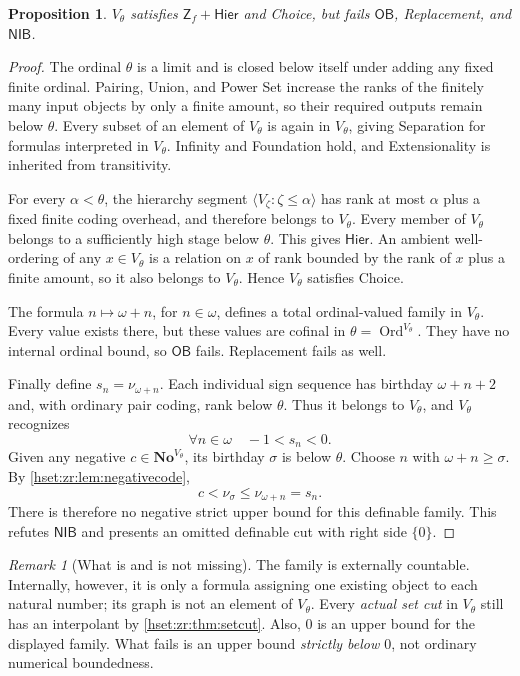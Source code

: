 \documentclass[11pt,letterpaper]{article}
\newtheorem{proposition}[proposition]{Proposition}\aliascntresetthe{proposition}
\theoremstyle{definition}
\theoremstyle{remark}
\newtheorem{remark}[remark]{Remark}\aliascntresetthe{remark}
\newcommand{\No}{\mathbf{No}}
\newcommand{\Ord}{\operatorname{Ord}}
\newcommand{\Zf}{\mathsf{Z}_{\!f}}
\newcommand{\Hier}{\mathsf{Hier}}
\newcommand{\OB}{\mathsf{OB}}
\newcommand{\NIB}{\mathsf{NIB}}
\newcommand{\seq}[1]{\langle #1\rangle}
\begin{document}
\begin{proposition}
\label{hset:zr:prop:rankmodel}
$V_\theta$ satisfies $\Zf+\Hier$ and Choice, but fails $\OB$, Replacement, and $\NIB$.
\end{proposition}
\begin{proof}
The ordinal $\theta$ is a limit and is closed below itself under adding any fixed finite ordinal. Pairing, Union, and Power Set increase the ranks of the finitely many input objects by only a finite amount, so their required outputs remain below $\theta$. Every subset of an element of $V_\theta$ is again in $V_\theta$, giving Separation for formulas interpreted in $V_\theta$. Infinity and Foundation hold, and Extensionality is inherited from transitivity.

For every $\alpha<\theta$, the hierarchy segment $\seq{V_\zeta:\zeta\leq\alpha}$ has rank at most $\alpha$ plus a fixed finite coding overhead, and therefore belongs to $V_\theta$. Every member of $V_\theta$ belongs to a sufficiently high stage below $\theta$. This gives $\Hier$. An ambient well-ordering of any $x\in V_\theta$ is a relation on $x$ of rank bounded by the rank of $x$ plus a finite amount, so it also belongs to $V_\theta$. Hence $V_\theta$ satisfies Choice.

The formula $n\mapsto\omega+n$, for $n\in\omega$, defines a total ordinal-valued family in $V_\theta$. Every value exists there, but these values are cofinal in $\theta=\Ord^{V_\theta}$. They have no internal ordinal bound, so $\OB$ fails. Replacement fails as well.

Finally define $s_n=\nu_{\omega+n}$. Each individual sign sequence has birthday $\omega+n+2$ and, with ordinary pair coding, rank below $\theta$. Thus it belongs to $V_\theta$, and $V_\theta$ recognizes
\[
\forall n\in\omega\quad -1<s_n<0.
\]
Given any negative $c\in\No^{V_\theta}$, its birthday $\sigma$ is below $\theta$. Choose $n$ with $\omega+n\geq\sigma$. By \cref{hset:zr:lem:negativecode},
\[
c<\nu_\sigma\leq\nu_{\omega+n}=s_n.
\]
There is therefore no negative strict upper bound for this definable family. This refutes $\NIB$ and presents an omitted definable cut with right side $\{0\}$.
\end{proof}

\begin{remark}[What is and is not missing]
The family is externally countable. Internally, however, it is only a formula assigning one existing object to each natural number; its graph is not an element of $V_\theta$. Every \emph{actual set cut} in $V_\theta$ still has an interpolant by \cref{hset:zr:thm:setcut}. Also, $0$ is an upper bound for the displayed family. What fails is an upper bound \emph{strictly below $0$}, not ordinary numerical boundedness.
\end{remark}
\end{document}
